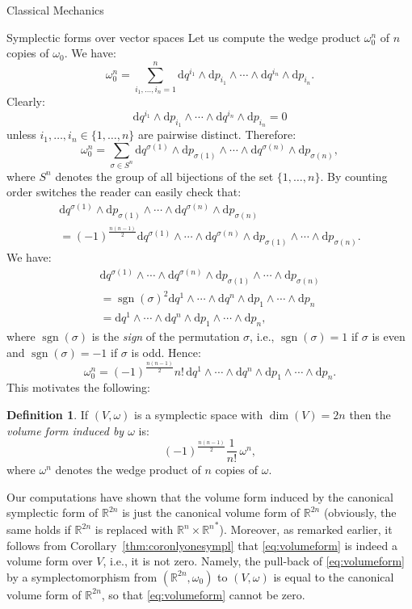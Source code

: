 \documentclass[oneside,a4paper,11pt]{amsbook}
\newcommand{\R}{\mathds R}
\newcommand{\dd}{\mathrm d}
\DeclareMathOperator{\sgn}{sgn}
\DeclareMathOperator{\Dim}{dim}
\theoremstyle{remark}\newtheorem{exercise}{Exercise}[chapter]
\theoremstyle{plain}\newtheorem{teo}{Theorem}[section]
\theoremstyle{plain}\newtheorem{lem}[teo]{Lemma}
\theoremstyle{plain}\newtheorem{prop}[teo]{Proposition}
\theoremstyle{plain}\newtheorem{cor}[teo]{Corollary}
\theoremstyle{definition}\newtheorem{defin}[teo]{Definition}
\theoremstyle{remark}\newtheorem{rem}[teo]{Remark}
\theoremstyle{definition}\newtheorem{notation}[teo]{Notation}
\theoremstyle{definition}\newtheorem{convention}[teo]{Convention}
\theoremstyle{definition}\newtheorem{example}[teo]{Example}
\numberwithin{section}{chapter}
\numberwithin{equation}{section}
\begin{document}
\begin{chapter}{Classical Mechanics}
\begin{section}{Symplectic forms over vector spaces}
Let us compute the wedge product $\omega_0^n$ of $n$ copies of $\omega_0$. We have:
\[\omega_0^n=\sum_{i_1,\ldots,i_n=1}^n\dd q^{i_1}\wedge\dd p_{i_1}\wedge\cdots\wedge\dd q^{i_n}\wedge\dd p_{i_n}.\]
Clearly:
\[\dd q^{i_1}\wedge\dd p_{i_1}\wedge\cdots\wedge\dd q^{i_n}\wedge\dd p_{i_n}=0\]
unless $i_1,\ldots,i_n\in\{1,\ldots,n\}$ are pairwise distinct. Therefore:
\[\omega_0^n=\sum_{\sigma\in S^n}\dd q^{\sigma(1)}\wedge\dd p_{\sigma(1)}\wedge\cdots\wedge\dd q^{\sigma(n)}
\wedge\dd p_{\sigma(n)},\]
where $S^n$ denotes the group of all bijections of the set $\{1,\ldots,n\}$.
By counting order switches the reader can easily check that:
\begin{multline*}
\dd q^{\sigma(1)}\wedge\dd p_{\sigma(1)}\wedge\cdots\wedge\dd q^{\sigma(n)}\wedge\dd p_{\sigma(n)}\\
=(-1)^{\frac{n(n-1)}2}\dd q^{\sigma(1)}\wedge\cdots\wedge\dd q^{\sigma(n)}\wedge\dd p_{\sigma(1)}\wedge
\cdots\wedge\dd p_{\sigma(n)}.
\end{multline*}
We have:
\begin{multline*}
\dd q^{\sigma(1)}\wedge\cdots\wedge\dd q^{\sigma(n)}\wedge\dd p_{\sigma(1)}\wedge\cdots\wedge\dd p_{\sigma(n)}\\
=\sgn(\sigma)^2\dd q^1\wedge\cdots\wedge\dd q^n\wedge\dd p_1\wedge\cdots\wedge\dd p_n\\
=\dd q^1\wedge\cdots\wedge\dd q^n\wedge\dd p_1\wedge\cdots\wedge\dd p_n,
\end{multline*}
where $\sgn(\sigma)$ is the {\em sign\/} of the permutation $\sigma$, i.e., $\sgn(\sigma)=1$ if $\sigma$ is even and $\sgn(\sigma)=-1$ if $\sigma$ is odd.
Hence:
\[\omega_0^n=(-1)^{\frac{n(n-1)}2}n!\,\dd q^1\wedge\cdots\wedge\dd q^n\wedge\dd p_1\wedge\cdots\wedge\dd p_n.\]
This motivates the following:

\begin{defin}\label{thm:defvolume}
If $(V,\omega)$ is a symplectic space with $\Dim(V)=2n$ then the {\em volume form induced by $\omega$\/}
is:
\begin{equation}\label{eq:volumeform}
(-1)^{\frac{n(n-1)}2}\frac1{n!}\,\omega^n,
\end{equation}
where $\omega^n$ denotes the wedge product of $n$ copies of $\omega$.
\end{defin}
Our computations have shown that the volume form induced by the canonical symplectic form of $\R^{2n}$ is just
the canonical volume form of $\R^{2n}$ (obviously, the same holds if $\R^{2n}$ is replaced with $\R^n\times{\R^n}^*$).
Moreover, as remarked earlier, it follows from Corollary~\ref{thm:coronlyonesympl}
that \eqref{eq:volumeform} is indeed a volume form over $V$, i.e., it is not zero. Namely, the pull-back
of \eqref{eq:volumeform} by a symplectomorphism from $(\R^{2n},\omega_0)$ to $(V,\omega)$ is equal to the canonical volume
form of $\R^{2n}$, so that \eqref{eq:volumeform} cannot be zero.


\end{section}
\end{chapter}
\end{document}
